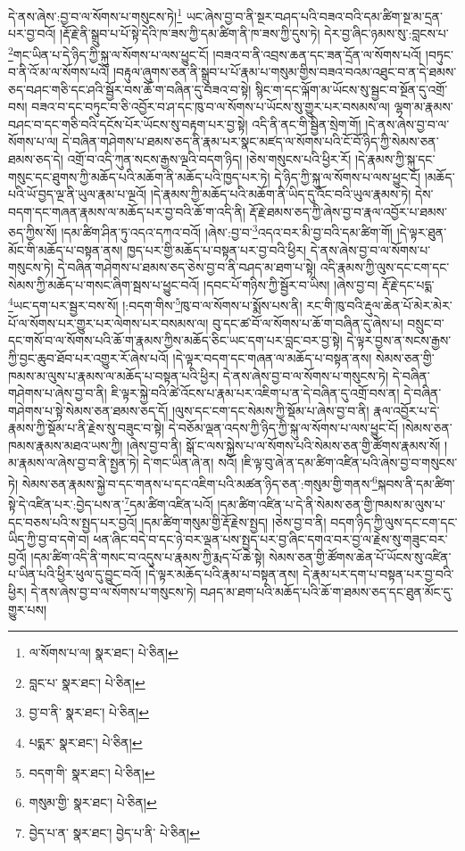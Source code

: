 དེ་ནས་ཞེས་:བྱ་བ་ལ་སོགས་པ་གསུངས་ཏེ།\footnote{ལ་སོགས་པ་ལ།  སྣར་ཐང་།  པེ་ཅིན། } ཡང་ཞེས་བྱ་བ་ནི་སྔར་བཤད་པའི་བཟའ་བའི་དམ་ཚིག་སྔ་མ་དྲན་པར་བྱ་བའོ། །རྡོ་རྗེ་ནི་སྒྲུབ་པ་པོ་སྟེ་དེའི་ཁ་ཟས་ཀྱི་དམ་ཚིག་ནི་ཁ་ཟས་ཀྱི་དུས་ཏེ། དེར་བྱ་ཞིང་ཉམས་སུ་:བླངས་པ་\footnote{བླང་པ་  སྣར་ཐང་།  པེ་ཅིན། }གང་ཡིན་པ་དེ་ཉིད་ཀྱི་སྐུ་ལ་སོགས་པ་ལས་ཕྱུང་ངོ། །བཟའ་བ་ནི་འབྲས་ཆན་དང་ཟན་དྲོན་ལ་སོགས་པའོ། །བཏུང་བ་ནི་འོ་མ་ལ་སོགས་པའོ། །བརྟུལ་ཞུགས་ཅན་ནི་སྒྲུབ་པ་པོ་རྣམ་པ་གསུམ་གྱིས་བཟའ་བའམ་འཐུང་བ་ན་དེ་ཐམས་ཅད་བཤང་གཅི་དང་ཤའི་སྦྱོར་བས་ཆོ་ག་བཞིན་དུ་བཟའ་བ་སྟེ། སྙིང་ག་དང་ལྐོག་མ་ཡོངས་སུ་སྦྱང་བ་སྔོན་དུ་འགྲོ་བས། བཟའ་བ་དང་བཏུང་བ་ཅི་འབྱོར་བ་ཤ་དང་ཁུ་བ་ལ་སོགས་པ་ཡོངས་སུ་གྱུར་པར་བསམས་ལ། ལྷག་མ་རྣམས་བཤང་བ་དང་གཅི་བའི་དངོས་པོར་ཡོངས་སུ་བརྟག་པར་བྱ་སྟེ། འདི་ནི་ནང་གི་སྦྱིན་སྲེག་གོ། །དེ་ནས་ཞེས་བྱ་བ་ལ་སོགས་པ་ལ། དེ་བཞིན་གཤེགས་པ་ཐམས་ཅད་ནི་རྣམ་པར་སྣང་མཛད་ལ་སོགས་པའི་ངོ་བོ་ཉིད་ཀྱི་སེམས་ཅན་ཐམས་ཅད་དེ། འགྲོ་བ་འདི་ཀུན་སངས་རྒྱས་ལྔའི་བདག་ཉིད། །ཅེས་གསུངས་པའི་ཕྱིར་རོ། །དེ་རྣམས་ཀྱི་སྐུ་དང་གསུང་དང་ཐུགས་ཀྱི་མཆོད་པའི་མཆོག་ནི་མཆོད་པའི་ཁྱད་པར་ཏེ། དེ་ཉིད་ཀྱི་སྐུ་ལ་སོགས་པ་ལས་ཕྱུང་ངོ། །མཆོད་པའི་ཡོ་བྱད་ལྔ་ནི་ཡུལ་རྣམ་པ་ལྔའོ། །དེ་རྣམས་ཀྱི་མཆོད་པའི་མཆོག་ནི་ཡིད་དུ་འོང་བའི་ཡུལ་རྣམས་ཏེ། དེས་བདག་དང་གཞན་རྣམས་ལ་མཆོད་པར་བྱ་བའི་ཆོ་ག་འདི་ནི། རྡོ་རྗེ་ཐམས་ཅད་ཀྱི་ཞེས་བྱ་བ་རྣལ་འབྱོར་པ་ཐམས་ཅད་ཀྱིས་སོ། །དམ་ཚིག་ཤིན་ཏུ་འདའ་དཀའ་བའོ། །ཞེས་:བྱ་བ་\footnote{བྱ་བ་ནི་  སྣར་ཐང་།  པེ་ཅིན། }འདའ་བར་མི་བྱ་བའི་དམ་ཚིག་གོ། །དེ་ལྟར་ཐུན་མོང་གི་མཆོད་པ་བསྟན་ནས། ཁྱད་པར་གྱི་མཆོད་པ་བསྟན་པར་བྱ་བའི་ཕྱིར། དེ་ནས་ཞེས་བྱ་བ་ལ་སོགས་པ་གསུངས་ཏེ། དེ་བཞིན་གཤེགས་པ་ཐམས་ཅད་ཅེས་བྱ་བ་ནི་བཤད་མ་ཐག་པ་སྟེ། འདི་རྣམས་ཀྱི་ལུས་དང་ངག་དང་སེམས་ཀྱི་མཆོད་པ་གསང་ཞིག་སྦས་པ་ཕྱུང་བའོ། །དབང་པོ་གཉིས་ཀྱི་སྦྱོར་བ་ཡིས། །ཞེས་བྱ་བ། རྡོ་རྗེ་དང་པདྨ་\footnote{པདྨར་  སྣར་ཐང་།  པེ་ཅིན། }ཡང་དག་པར་སྦྱར་བས་སོ། །:བདག་གིས་\footnote{བདག་གི་  སྣར་ཐང་།  པེ་ཅིན། }ཁུ་བ་ལ་སོགས་པ་སྨོས་པས་ནི། རང་གི་ཁུ་བའི་རྡུལ་ཆེན་པོ་མེར་མེར་པོ་ལ་སོགས་པར་གྱུར་པར་ལེགས་པར་བསམས་ལ། བུ་དང་ཚ་བོ་ལ་སོགས་པ་ཆོ་ག་བཞིན་དུ་ཞེས་པ། བསྲུང་བ་དང་གསོ་བ་ལ་སོགས་པའི་ཆོ་ག་རྣམས་ཀྱིས་མཆོད་ཅིང་ཡང་དག་པར་བླང་བར་བྱ་སྟེ། དེ་ལྟར་བྱས་ན་སངས་རྒྱས་ཀྱི་བྱང་ཆུབ་ཐོབ་པར་འགྱུར་རོ་ཞེས་པའོ། །དེ་ལྟར་བདག་དང་གཞན་ལ་མཆོད་པ་བསྟན་ནས། སེམས་ཅན་གྱི་ཁམས་མ་ལུས་པ་རྣམས་ལ་མཆོད་པ་བསྟན་པའི་ཕྱིར། དེ་ནས་ཞེས་བྱ་བ་ལ་སོགས་པ་གསུངས་ཏེ། དེ་བཞིན་གཤེགས་པ་ཞེས་བྱ་བ་ནི། ཇི་ལྟར་སྐྱེ་བའི་ཚེ་འོངས་པ་རྣམ་པར་འཇིག་པ་ན་དེ་བཞིན་དུ་འགྲོ་བས་ན། དེ་བཞིན་གཤེགས་པ་སྟེ་སེམས་ཅན་ཐམས་ཅད་དོ། །ལུས་དང་ངག་དང་སེམས་ཀྱི་སྡོམ་པ་ཞེས་བྱ་བ་ནི། རྣལ་འབྱོར་པ་དེ་རྣམས་ཀྱི་སྡོམ་པ་ནི་རྗེས་སུ་བཟུང་བ་སྟེ། དེ་བཅོམ་ལྡན་འདས་ཀྱི་ཉིད་ཀྱི་སྐུ་ལ་སོགས་པ་ལས་ཕྱུང་ངོ། །སེམས་ཅན་ཁམས་རྣམས་མཐའ་ཡས་ཀྱི། །ཞེས་བྱ་བ་ནི། སྒོ་ང་ལས་སྐྱེས་པ་ལ་སོགས་པའི་སེམས་ཅན་གྱི་ཚོགས་རྣམས་སོ། །མ་རྣམས་ལ་ཞེས་བྱ་བ་ནི་སྤྱན་ཏེ། དེ་གང་ཡིན་ཞེ་ན། སའོ། །ཇི་ལྟ་བུ་ཞེ་ན་དམ་ཚིག་འཛིན་པའི་ཞེས་བྱ་བ་གསུངས་ཏེ། སེམས་ཅན་རྣམས་སྐྱེ་བ་དང་གནས་པ་དང་འཇིག་པའི་མཚན་ཉིད་ཅན་:གསུམ་གྱི་གནས་\footnote{གསུམ་གྱི་  སྣར་ཐང་།  པེ་ཅིན། }སྐབས་ནི་དམ་ཚིག་སྟེ་དེ་འཛིན་པར་:བྱེད་པས་ན་\footnote{བྱེད་པ་ན་  སྣར་ཐང་། བྱེད་པ་ནི་  པེ་ཅིན། }དམ་ཚིག་འཛིན་པའོ། །དམ་ཚིག་འཛིན་པ་དེ་ནི་སེམས་ཅན་གྱི་ཁམས་མ་ལུས་པ་དང་བཅས་པའི་ས་སྤྱད་པར་བྱའོ། །དམ་ཚིག་གསུམ་གྱི་རྡོ་རྗེས་སྤྱད། །ཅེས་བྱ་བ་ནི། བདག་ཉིད་ཀྱི་ལུས་དང་ངག་དང་ཡིད་ཀྱི་བྱ་བ་དགེ་བ། ཕན་ཞིང་བདེ་བ་དང་ཉེ་བར་ལྡན་པས་སྤྱད་པར་བྱ་ཞིང་དགའ་བར་བྱ་ལ་རྗེས་སུ་གཟུང་བར་བྱའོ། །དམ་ཚིག་འདི་ནི་གསང་བ་འདུས་པ་རྣམས་ཀྱི་རྨད་པོ་ཆེ་སྟེ། སེམས་ཅན་གྱི་ཚོགས་ཆེན་པོ་ཡོངས་སུ་འཛིན་པ་ཡིན་པའི་ཕྱིར་ཕུལ་དུ་བྱུང་བའོ། །དེ་ལྟར་མཆོད་པའི་རྣམ་པ་བསྟན་ནས། དེ་རྣམ་པར་དག་པ་བསྟན་པར་བྱ་བའི་ཕྱིར། དེ་ནས་ཞེས་བྱ་བ་ལ་སོགས་པ་གསུངས་ཏེ། བཤད་མ་ཐག་པའི་མཆོད་པའི་ཆོ་ག་ཐམས་ཅད་དང་ཐུན་མོང་དུ་གྱུར་པས། 